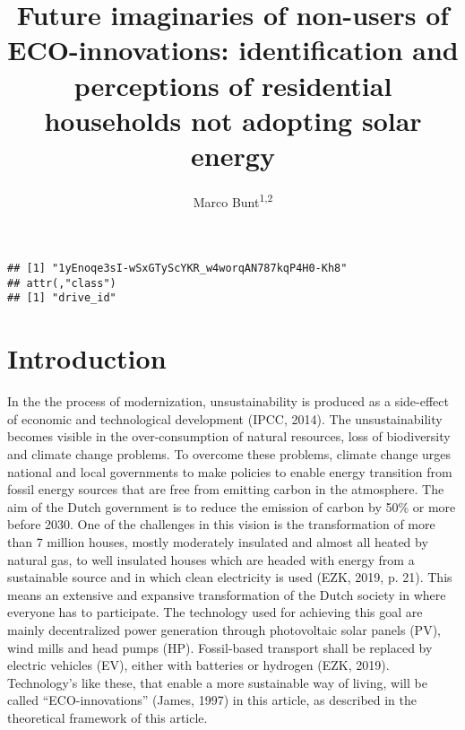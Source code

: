 \documentclass[man,floatsintext]{apa6}
\title{Future imaginaries of non-users of ECO-innovations: identification and
perceptions of residential households not adopting solar energy}
\author{Marco Bunt\textsuperscript{1,2}}
\date{}
\affiliation{
\vspace{0.5cm}
\textsuperscript{1} Erasmus school of social and behavioural sciences\\\textsuperscript{2} Stedin netbeheer}
\begin{document}
\maketitle

\begin{verbatim}
## [1] "1yEnoqe3sI-wSxGTyScYKR_w4worqAN787kqP4H0-Kh8"
## attr(,"class")
## [1] "drive_id"
\end{verbatim}

\section{Introduction}\label{introduction}

In the the process of modernization, unsustainability is produced as a
side-effect of economic and technological development (IPCC, 2014). The
unsustainability becomes visible in the over-consumption of natural
resources, loss of biodiversity and climate change problems. To overcome
these problems, climate change urges national and local governments to
make policies to enable energy transition from fossil energy sources
that are free from emitting carbon in the atmosphere. The aim of the
Dutch government is to reduce the emission of carbon by 50\% or more
before 2030. One of the challenges in this vision is the transformation
of more than 7 million houses, mostly moderately insulated and almost
all heated by natural gas, to well insulated houses which are headed
with energy from a sustainable source and in which clean electricity is
used (EZK, 2019, p. 21). This means an extensive and expansive
transformation of the Dutch society in where everyone has to
participate. The technology used for achieving this goal are mainly
decentralized power generation through photovoltaic solar panels (PV),
wind mills and head pumps (HP). Fossil-based transport shall be replaced
by electric vehicles (EV), either with batteries or hydrogen (EZK,
2019). Technology's like these, that enable a more sustainable way of
living, will be called \enquote{ECO-innovations} (James, 1997) in this
article, as described in the theoretical framework of this article.
\end{document}
